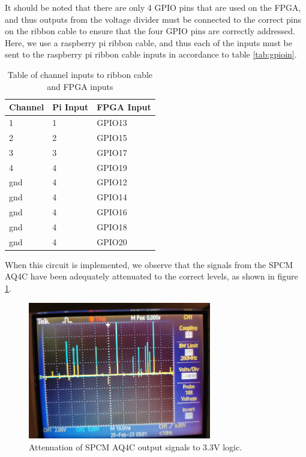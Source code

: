 \documentclass[letterpaper, 11 pt]{article}
\begin{document}
It should be noted that there are only 4 GPIO pins that are used on the FPGA, and thus outputs
from the voltage divider must be connected to the correct pins on the ribbon cable to ensure
that the four GPIO pins are correctly addressed. Here, we use
a raspberry pi ribbon cable, and thus each of the inputs must be sent to the raspberry pi ribbon cable
inputs in accordance to table \ref{tab:gpioin}.
\begin{table}[H]
    \centering
    \begin{tabular}{|l|l|l|}
    \hline
    \textbf{Channel} & \textbf{Pi Input} & \textbf{FPGA Input} \\ \hline
    1        & 1 &  GPIO13                 \\ \hline
    2        & 2 &    GPIO15              \\ \hline
    3      & 3 &        GPIO17         \\ \hline
    4      & 4 &          GPIO19       \\ \hline
    gnd      & 4 &          GPIO12       \\ \hline
    gnd     & 4 &          GPIO14       \\ \hline
    gnd      & 4 &          GPIO16       \\ \hline
    gnd      & 4 &          GPIO18       \\ \hline
    gnd      & 4 &          GPIO20       \\ \hline
    \end{tabular}
    \caption{Table of channel inputs to ribbon cable and FPGA inputs}
\end{table}\label{tab:gpioin}

When this circuit is implemented, we observe that the signals from the SPCM AQ4C
have been adequately attenuated to the correct levels, as shown in figure \ref{fig:signals}.
\begin{figure}[H]
    \centering
    \includegraphics[width = 8cm]{BB_attenuate.jpg}
    \caption{Attenuation of SPCM AQ4C output signals to 3.3V logic.}
    \label{fig:signals}
\end{figure}
\end{document}
